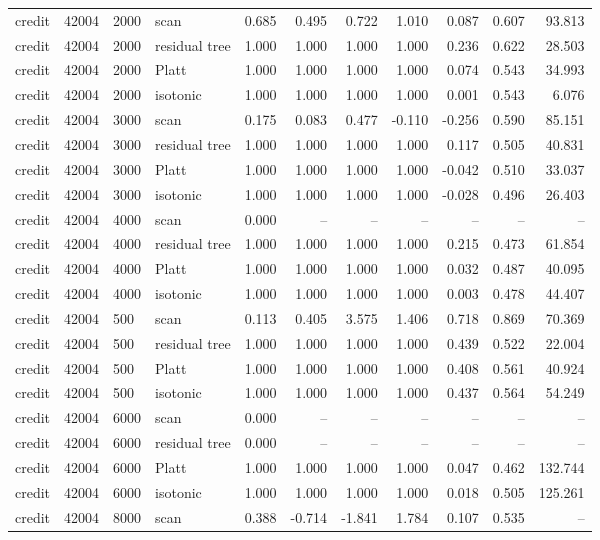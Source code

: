 \begin{tabular}{lrllrrrrrrr}
credit & 42004 & 2000 & scan & 0.685 & 0.495 & 0.722 & 1.010 & 0.087 & 0.607 & 93.813 \\
credit & 42004 & 2000 & residual tree & 1.000 & 1.000 & 1.000 & 1.000 & 0.236 & 0.622 & 28.503 \\
credit & 42004 & 2000 & Platt & 1.000 & 1.000 & 1.000 & 1.000 & 0.074 & 0.543 & 34.993 \\
credit & 42004 & 2000 & isotonic & 1.000 & 1.000 & 1.000 & 1.000 & 0.001 & 0.543 & 6.076 \\
credit & 42004 & 3000 & scan & 0.175 & 0.083 & 0.477 & -0.110 & -0.256 & 0.590 & 85.151 \\
credit & 42004 & 3000 & residual tree & 1.000 & 1.000 & 1.000 & 1.000 & 0.117 & 0.505 & 40.831 \\
credit & 42004 & 3000 & Platt & 1.000 & 1.000 & 1.000 & 1.000 & -0.042 & 0.510 & 33.037 \\
credit & 42004 & 3000 & isotonic & 1.000 & 1.000 & 1.000 & 1.000 & -0.028 & 0.496 & 26.403 \\
credit & 42004 & 4000 & scan & 0.000 & -- & -- & -- & -- & -- & -- \\
credit & 42004 & 4000 & residual tree & 1.000 & 1.000 & 1.000 & 1.000 & 0.215 & 0.473 & 61.854 \\
credit & 42004 & 4000 & Platt & 1.000 & 1.000 & 1.000 & 1.000 & 0.032 & 0.487 & 40.095 \\
credit & 42004 & 4000 & isotonic & 1.000 & 1.000 & 1.000 & 1.000 & 0.003 & 0.478 & 44.407 \\
credit & 42004 & 500 & scan & 0.113 & 0.405 & 3.575 & 1.406 & 0.718 & 0.869 & 70.369 \\
credit & 42004 & 500 & residual tree & 1.000 & 1.000 & 1.000 & 1.000 & 0.439 & 0.522 & 22.004 \\
credit & 42004 & 500 & Platt & 1.000 & 1.000 & 1.000 & 1.000 & 0.408 & 0.561 & 40.924 \\
credit & 42004 & 500 & isotonic & 1.000 & 1.000 & 1.000 & 1.000 & 0.437 & 0.564 & 54.249 \\
credit & 42004 & 6000 & scan & 0.000 & -- & -- & -- & -- & -- & -- \\
credit & 42004 & 6000 & residual tree & 0.000 & -- & -- & -- & -- & -- & -- \\
credit & 42004 & 6000 & Platt & 1.000 & 1.000 & 1.000 & 1.000 & 0.047 & 0.462 & 132.744 \\
credit & 42004 & 6000 & isotonic & 1.000 & 1.000 & 1.000 & 1.000 & 0.018 & 0.505 & 125.261 \\
credit & 42004 & 8000 & scan & 0.388 & -0.714 & -1.841 & 1.784 & 0.107 & 0.535 & -- \\

\end{tabular}
